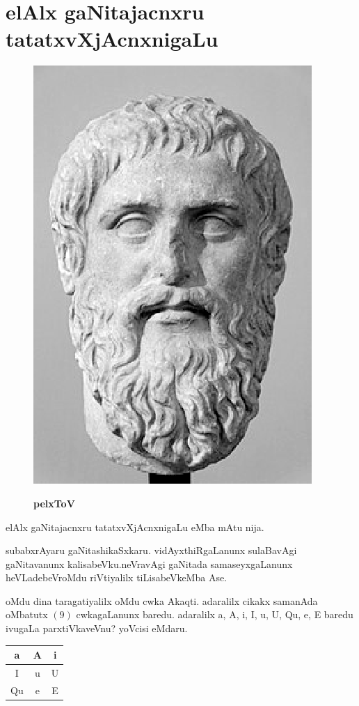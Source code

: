 \chapter{elAlx gaNitajacnxru tatatxvXjAcnxnigaLu}

\begin{figure}
  \centering\includegraphics[scale=0.8]{src/figures/Plato.eps}
  
  {\bf pelxToV}
    \end{figure}
elAlx gaNitajacnxru tatatxvXjAcnxnigaLu eMba mAtu nija.

subabxrAyaru gaNitashikaSxkaru. vidAyxthiR\-gaLanunx sulaBavAgi gaNitavanunx kalisabeVku.\break neVravAgi gaNitada samaseyxgaLanunx heVLade\break beVroMdu riVtiyalilx tiLisabeVkeMba Ase.

oMdu dina taragatiyalilx oMdu cwka Akaqti. adaralilx cikakx samanAda oMbatutx $(9)$ cwkagaLanunx baredu. adaralilx a, A, i, I, u, U, Qu, e, E baredu ivugaLa parxtiVkaveVnu? yoVcisi eMdaru.
\begin{center}
\begin{tabular}{|c|c|c|}
\hline
a & A & i\\
\hline
I & u & U\\
\hline
Qu & e & E\\
\hline
\end{tabular}
\end{center}



